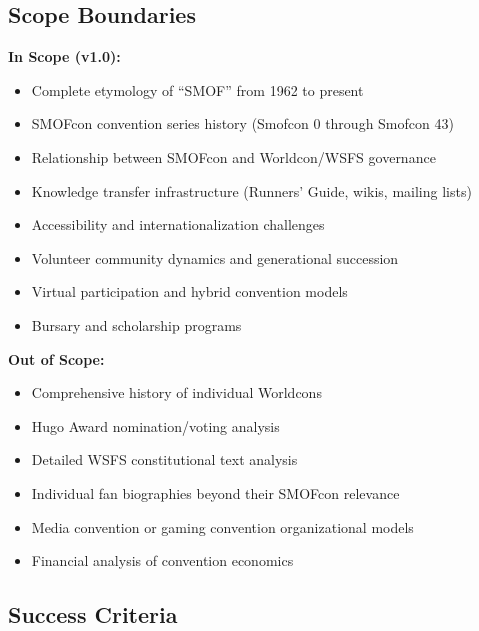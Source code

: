 \documentclass[11pt,letterpaper]{article}
\begin{document}
\subsection{Scope Boundaries}

\textbf{In Scope (v1.0):}
\begin{itemize}[leftmargin=2em]
\item Complete etymology of ``SMOF'' from 1962 to present
\item SMOFcon convention series history (Smofcon 0 through Smofcon 43)
\item Relationship between SMOFcon and Worldcon/WSFS governance
\item Knowledge transfer infrastructure (Runners' Guide, wikis, mailing lists)
\item Accessibility and internationalization challenges
\item Volunteer community dynamics and generational succession
\item Virtual participation and hybrid convention models
\item Bursary and scholarship programs
\end{itemize}

\textbf{Out of Scope:}
\begin{itemize}[leftmargin=2em]
\item Comprehensive history of individual Worldcons
\item Hugo Award nomination/voting analysis
\item Detailed WSFS constitutional text analysis
\item Individual fan biographies beyond their SMOFcon relevance
\item Media convention or gaming convention organizational models
\item Financial analysis of convention economics
\end{itemize}

\subsection{Success Criteria}
\end{document}
